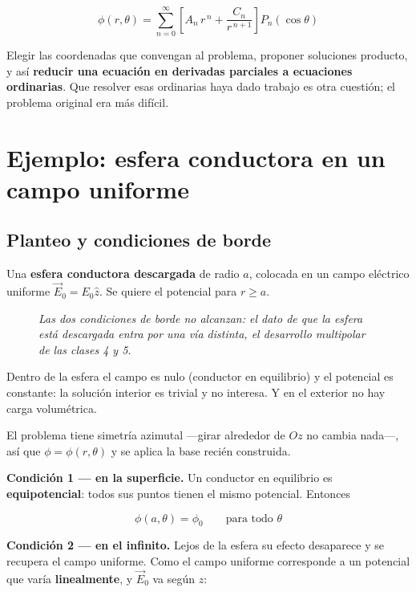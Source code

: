 \documentclass[12pt,a4paper]{article}
\begin{document}
\[
\boxed{\;\phi(r,\theta) = \sum_{n=0}^{\infty}\left[A_n\,r^{\,n} + \frac{C_n}{r^{\,n+1}}\right]P_n(\cos\theta)\;}
\]

\begin{keybox}
Elegir las coordenadas que convengan al problema, proponer soluciones producto, y
así \textbf{reducir una ecuación en derivadas parciales a ecuaciones ordinarias}.
Que resolver esas ordinarias haya dado trabajo es otra cuestión; el problema
original era más difícil.
\end{keybox}

\section{Ejemplo: esfera conductora en un campo uniforme}

\subsection{Planteo y condiciones de borde}

Una \textbf{esfera conductora descargada} de radio $a$, colocada en un campo
eléctrico uniforme $\vec E_0 = E_0\hat z$. Se quiere el potencial para $r \ge a$.

\begin{figure}[H]
  \centering
  
  \caption*{\small\itshape Las dos condiciones de borde no alcanzan: el dato de
  que la esfera está descargada entra por una vía distinta, el desarrollo
  multipolar de las clases 4 y 5.}
\end{figure}

\begin{notebox}
Dentro de la esfera el campo es nulo (conductor en equilibrio) y el potencial es
constante: la solución interior es trivial y no interesa. Y en el exterior no hay
carga volumétrica.

El problema tiene simetría azimutal ---girar alrededor de $Oz$ no cambia nada---,
así que $\phi = \phi(r,\theta)$ y se aplica la base recién construida.
\end{notebox}

\textbf{Condición 1 --- en la superficie.} Un conductor en equilibrio es
\textbf{equipotencial}: todos sus puntos tienen el mismo potencial. Entonces

\[
\phi(a,\theta) = \phi_0 \qquad\text{para todo }\theta
\]

\textbf{Condición 2 --- en el infinito.} Lejos de la esfera su efecto desaparece y
se recupera el campo uniforme. Como el campo uniforme corresponde a un potencial
que varía \textbf{linealmente}, y $\vec E_0$ va según $\hat z$:
\end{document}
